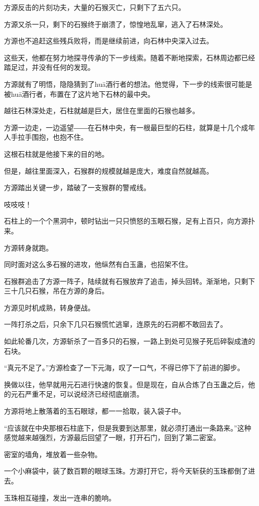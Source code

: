 \begin{this_body}
方源反击的片刻功夫，大量的石猴灭亡，只剩下了五六只。

方源又杀一只，剩下的石猴终于崩溃了，惊惶地乱窜，逃入了石林深处。

方源也不追赶这些残兵败将，而是继续前进，向石林中央深入过去。

这些天，他都在努力地探寻传承的下一步线索。随着不断地探索，石林周边都已经踏足过，并没有任何的发现。

方源就有了明悟，隐隐猜到了huā酒行者的想法。他觉得，下一步的线索很可能是被huā酒行者，布置在了这片地下石林的最中央。

越往石林深处走，石柱就越是巨大，居住在里面的石猴也越多。

方源一边走，一边遥望――在石林中央，有一根最巨型的石柱，就算是十几个成年人手拉手围抱，也抱不住。

这根石柱就是他接下来的目的地。

但是，越往里面深入，石猴群的规模就越是庞大，难度自然就越高。

方源踏出关键一步，踏破了一支猴群的警戒线。

吱吱吱！

石柱上的一个个黑洞中，顿时钻出一只只愤怒的玉眼石猴，足有上百只，向方源扑来。

方源转身就跑。

同时面对这么多石猴的进攻，他纵然有白玉蛊，也招架不住。

石猴群追击了方源一阵子，陆续就有石猴放弃了追击，掉头回转。渐渐地，只剩下三十几只石猴，吊在方源的身后。

方源见时机成熟，转身便战。

一阵打杀之后，只余下几只石猴慌忙逃窜，连原先的石洞都不敢回去了。

如此轮番几次，方源斩杀了一百多只的石猴，一路上到处可见猴子死后碎裂成渣的石块。

“真元不足了。”方源检查了一下元海，叹了一口气，不得已停下了前进的脚步。

换做以往，他早就用元石进行快速的恢复。但是现在，自从合炼了白玉蛊之后，他的元石严重不足，可以说经济已经彻底崩溃。

方源将地上散落着的玉石眼球，都一一拾取，装入袋子中。

“应该就在中央那根石柱底下，但是我要到达那里，就必须打通出一条路来。”这种感觉越来越强烈，方源最后回望了一眼，打开石门，回到了第二密室。

密室的墙角，堆放着一些杂物。

一个小麻袋中，装了数百颗的眼球玉珠。方源打开它，将今天斩获的玉珠都倒了进去。

玉珠相互碰撞，发出一连串的脆响。


\end{this_body}
